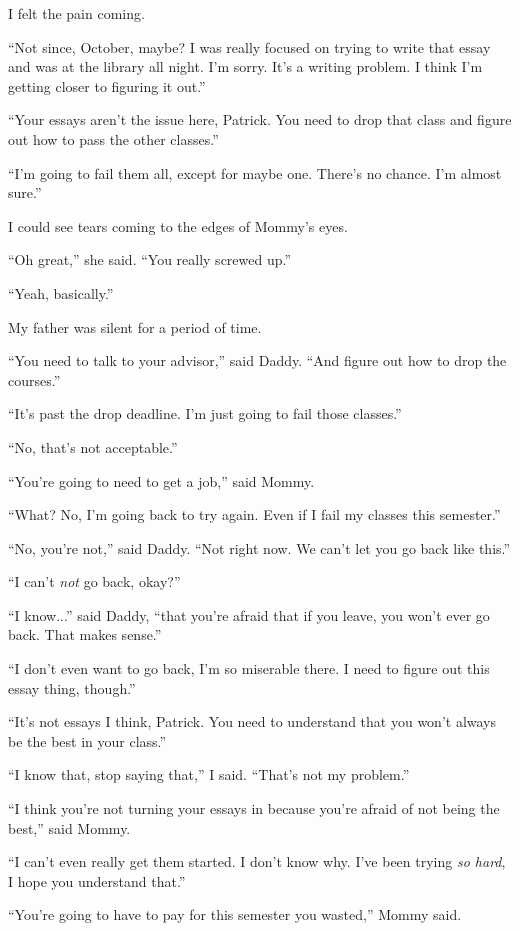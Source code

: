 I felt the pain coming.

``Not since, October, maybe?  I was really focused on trying to write that essay
and was at the library all night.  I'm sorry.  It's a writing problem.  I think
I'm getting closer to figuring it out.''
 
``Your essays aren't the issue here, Patrick.  You need to drop that class and
figure out how to pass the other classes.''

``I'm going to fail them all, except for maybe one.  There's no chance.  I'm
almost sure.''

I could see tears coming to the edges of Mommy's eyes.

``Oh great,'' she said.  ``You really screwed up.''

``Yeah, basically.''

My father was silent for a period of time.

``You need to talk to your advisor,'' said Daddy.  ``And figure out how to drop the
courses.''

``It's past the drop deadline.  I'm just going to fail those classes.''

``No, that's not acceptable.''

``You're going to need to get a job,'' said Mommy.

``What?  No, I'm going back to try again.  Even if I fail my classes this semester.''

``No, you're not,'' said Daddy.  ``Not right now.  We can't let you go back like this.''

``I can't \textit{not} go back, okay?''

``I know...'' said Daddy, ``that you're afraid that if you leave, you won't ever go
back.  That makes sense.''

``I don't even want to go back, I'm so miserable there.  I need to figure out
this essay thing, though.''

``It's not essays I think, Patrick.  You need to understand that you won't always be the
best in your class.''

``I know that, stop saying that,'' I said.  ``That's not my problem.''

``I think you're not turning your essays in because you're afraid of not being
the best,'' said Mommy.

``I can't even really get them started.  I don't know why.  I've been trying
\textit{so hard}, I hope you understand that.''

``You're going to have to pay for this semester you wasted,'' Mommy said.


